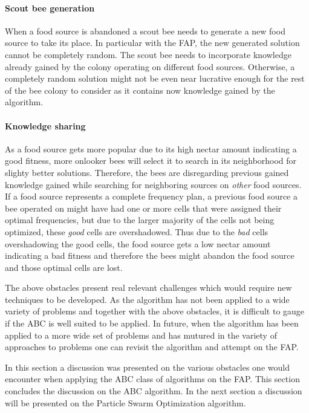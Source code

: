 \paragraph{Scout bee generation}
When a food source is abandoned a scout bee needs to generate a new food source to take its place. In particular with the FAP, the new generated solution cannot be completely random. The scout bee needs to incorporate knowledge already gained by the colony operating on different food sources. Otherwise, a completely random solution might not be even near lucrative enough for the rest of the bee colony to consider as it contains now knowledge gained by the algorithm.
\paragraph{Knowledge sharing}
As a food source gets more popular due to its high nectar amount indicating a good fitness, more onlooker bees will select it to search in its neighborhood for slighty better solutions. Therefore, the bees are disregarding previous gained knowledge gained while searching for neighboring sources on \emph{other} food sources. If a food source represents a complete frequency plan, a previous food source a bee operated on might have had one or more cells that were assigned their optimal frequencies, but due to the larger majority of the cells not being optimized, these \emph{good} cells are overshadowed. Thus due to the \emph{bad} cells overshadowing the good cells, the food source gets a low nectar amount indicating a bad fitness and therefore the bees might abandon the food source and those optimal cells are lost.

The above obstacles present real relevant challenges which would require new techniques to be developed. As the algorithm has not been applied to a wide variety of problems and together with the above obstacles, it is difficult to gauge if the ABC is well suited to be applied. In future, when the algorithm has been applied to a more wide set of problems and has mutured in the variety of approaches to problems one can revisit the algorithm and attempt on the FAP.

In this section a discussion was presented on the various obstacles one would encounter when applying the ABC class of algorithms on the FAP. This section concludes the discussion on the ABC algorithm. In the next section a discussion will be presented on the Particle Swarm Optimization algorithm.
